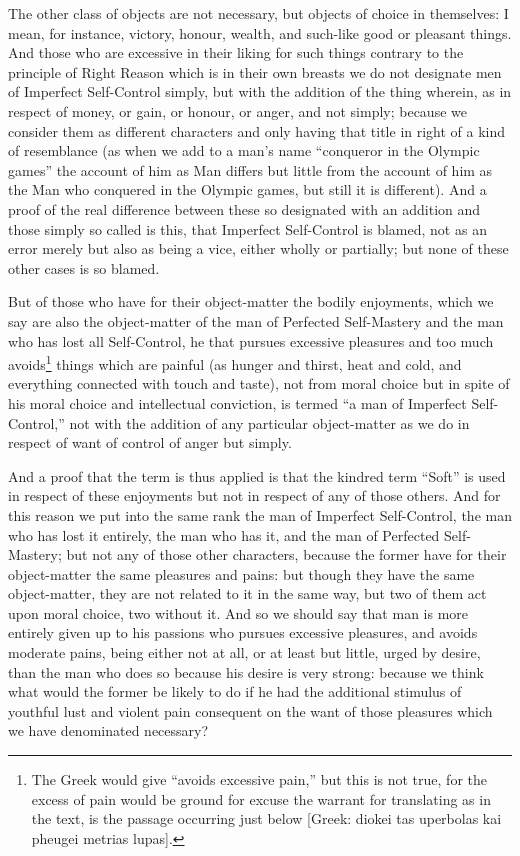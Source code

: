 The other class of objects are not necessary, but objects of choice in
themselves: I mean, for instance, victory, honour, wealth, and such-like good
or pleasant things. And those who are excessive in their liking for such things
contrary to the principle of Right Reason which is in their own breasts we do
not designate men of Imperfect Self-Control simply, but with the addition of
the thing wherein, as in respect of money, or gain, or honour, or anger, and
not simply; because we consider them as different characters and only having
that title in right of a kind of resemblance (as when we add to a man’s
name “conqueror in the Olympic games” the account of him as Man
differs but little from the account of him as the Man who conquered in the
Olympic games, but still it is different). And a proof of the real difference
between these so designated with an addition and those simply so called is
this, that Imperfect Self-Control is blamed, not as an error merely but also as
being a vice, either wholly or partially; but none of these other cases is so
blamed.

But of those who have for their object-matter the bodily enjoyments, which we
say are also the object-matter of the man of Perfected Self-Mastery and the man
who has lost all Self-Control, he that pursues excessive pleasures and too much
avoids\footnote{The Greek would give “avoids excessive pain,” but this is not true,
for the excess of pain would be ground for excuse the warrant for translating
as in the text, is the passage occurring just below [Greek: diokei tas
uperbolas kai pheugei metrias lupas].}
things which are painful (as hunger and thirst, heat and cold, and everything
connected with touch and taste), not from moral choice but in spite of his
moral choice and intellectual conviction, is termed “a man of Imperfect
Self-Control,” not with the addition of any particular object-matter as
we do in respect of want of control of anger but simply.

And a proof that the term is thus applied is that the kindred term
“Soft” is used in respect of these enjoyments but not in respect of
any of those others. And for this reason we put into the same rank the man of
Imperfect Self-Control, the man who has lost it entirely, the man who has it,
and the man of Perfected Self-Mastery; but not any of those other characters,
because the former have for their object-matter the same pleasures and pains:
but though they have the same object-matter, they are not related to it in the
same way, but two of them act upon moral choice, two without it. And so we
should say that man is more entirely given up to his passions who pursues
excessive pleasures, and avoids moderate pains, being either not at all, or at
least but little, urged by desire, than the man who does so because his desire
is very strong: because we think what would the former be likely to do if he
had the additional stimulus of youthful lust and violent pain consequent on the
want of those pleasures which we have denominated necessary?

